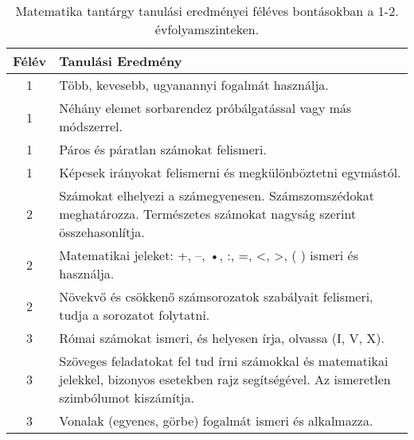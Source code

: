        
           \begin{longtable}{c | p{} }
            \caption[Matematika 1-2.]{Matematika tantárgy tanulási eredményei féléves bontásokban a 1-2. évfolyamszinteken. }  \\

            \textbf{Félév} & \textbf{Tanulási Eredmény} \\
            \hline
            \endhead
                                
                                          1 &  Több, kevesebb, ugyanannyi fogalmát használja. \\ \hline
                                          1 &  Néhány elemet sorbarendez próbálgatással vagy más módszerrel. \\ \hline
                                          1 &  Páros és páratlan számokat felismeri. \\ \hline
                                          1 &  Képesek irányokat felismerni és megkülönböztetni egymástól. \\ \hline
                                      
                                
                                          2 &  Számokat elhelyezi a számegyenesen. Számszomszédokat meghatározza. Természetes számokat nagyság szerint összehasonlítja. \\ \hline
                                          2 &  Matematikai jeleket: +, –, •, :, =, <, >, ( ) ismeri és használja. \\ \hline
                                          2 &  Növekvő és csökkenő számsorozatok szabályait felismeri, tudja a sorozatot folytatni. \\ \hline
                                      
                                
                                          3 &  Római számokat ismeri, és helyesen írja, olvassa (I, V, X). \\ \hline
                                          3 &  Szöveges feladatokat fel tud írni számokkal és matematikai jelekkel, bizonyos esetekben rajz segítségével. Az ismeretlen szimbólumot kiszámítja. \\ \hline
                                          3 &  Vonalak (egyenes, görbe) fogalmát ismeri és alkalmazza. \\ \hline
                                      

\end{longtable}
